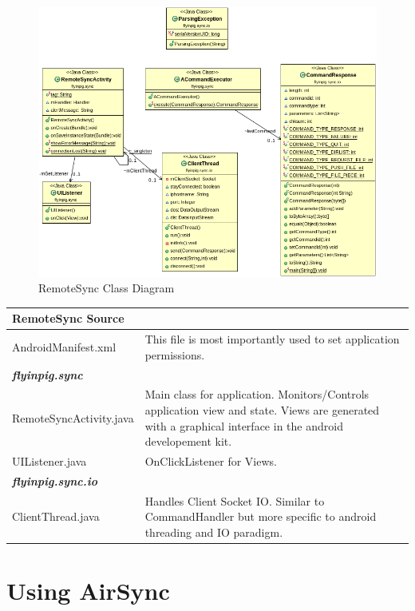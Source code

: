 \documentclass[12pt]{article}
\begin{document}
\begin{figure}[h]
\includegraphics[width=1\textwidth]{android-class-diag.png}
\caption{RemoteSync Class Diagram}
\end{figure}

\begin{center}
\begin{tabular}{|l|p{7.5cm}|}
\hline
	\textbf{RemoteSync Source} \\
\hline 
	AndroidManifest.xml
	& This file is most importantly used to set application permissions.\\
\hline
	\emph{\textbf{flyinpig.sync}}\\
\hline
	RemoteSyncActivity.java
	& Main class for application. Monitors/Controls application view and state. Views are generated with a graphical interface in the android developement kit.\\
\hline
	UIListener.java
	& OnClickListener for Views.\\
\hline
	\emph{\textbf{flyinpig.sync.io}}\\
\hline
	ClientThread.java
	& Handles Client Socket IO. Similar to CommandHandler but more specific to android threading and IO paradigm.\\
\hline
\end{tabular}
\end{center}

\section{Using AirSync}
\end{document}
